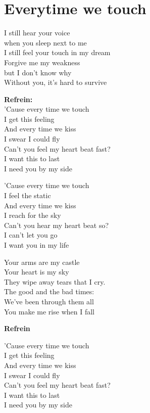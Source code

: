 \section{Everytime we touch}
I still hear your voice\\
when you sleep next to me\\
I still feel your touch in my dream\\
Forgive me my weakness\\
but I don't know why\\
Without you, it's hard to survive

\textbf{Refrein:}\\
'Cause every time we touch\\
I get this feeling\\
And every time we kiss\\
I swear I could fly\\
Can't you feel my heart beat fast?\\
I want this to last\\
I need you by my side

'Cause every time we touch\\
I feel the static\\
And every time we kiss\\
I reach for the sky\\
Can't you hear my heart beat so?\\
I can't let you go\\
I want you in my life

Your arms are my castle\\
Your heart is my sky\\
They wipe away tears that I cry.\\
The good and the bad times:\\
We've been through them all\\
You make me rise when I fall

\textbf{Refrein}

'Cause every time we touch\\
I get this feeling\\
And every time we kiss\\
I swear I could fly\\
Can't you feel my heart beat fast?\\
I want this to last\\
I need you by my side
